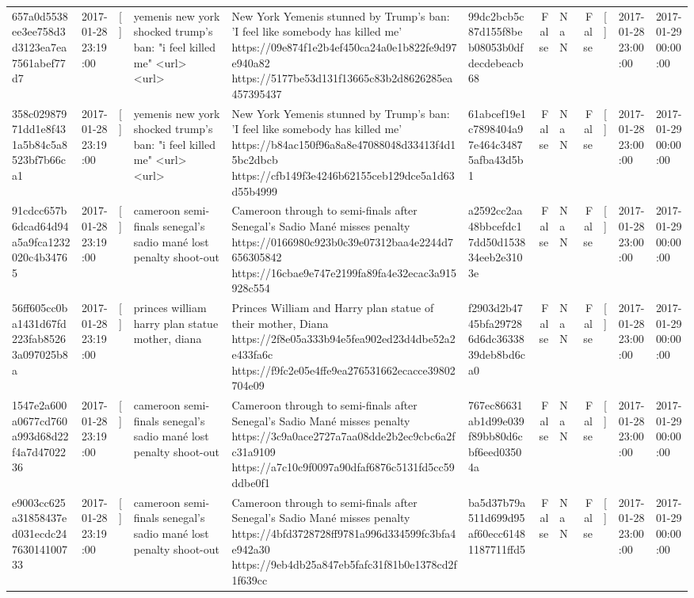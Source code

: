 \begin{tabular}{llllllrlrlll}
657a0d5538ee3ee758d3d3123ea7ea7561abef77d7 & 2017-01-28 23:19:00 & [] & yemenis new york shocked trump's ban: "i feel killed me" <url> <url> & New York Yemenis stunned by Trump's ban: 'I feel like somebody has killed me' https://09e874f1e2b4ef450ca24a0e1b822fe9d97e940a82 https://5177be53d131f13665c83b2d8626285ea457395437 & 99dc2bcb5c87d155f8beb08053b0dfdecdebeacb68 & False & NaN & False & [] & 2017-01-28 23:00:00 & 2017-01-29 00:00:00 \\
358c02987971dd1e8f431a5b84c5a8523bf7b66ca1 & 2017-01-28 23:19:00 & [] & yemenis new york shocked trump's ban: "i feel killed me" <url> <url> & New York Yemenis stunned by Trump's ban: 'I feel like somebody has killed me' https://b84ac150f96a8a8e47088048d33413f4d15bc2dbcb https://cfb149f3e4246b62155ceb129dce5a1d63d55b4999 & 61abcef19e1c7898404a97e464c34875afba43d5b1 & False & NaN & False & [] & 2017-01-28 23:00:00 & 2017-01-29 00:00:00 \\
91cdcc657b6dcad64d94a5a9fca1232020c4b34765 & 2017-01-28 23:19:00 & [] & cameroon semi-finals senegal's sadio mané lost penalty shoot-out & Cameroon through to semi-finals after Senegal’s Sadio Mané misses penalty https://0166980c923b0c39e07312baa4e2244d7656305842 https://16cbae9e747e2199fa89fa4e32ecac3a915928c554 & a2592cc2aa48bbcefdc17dd50d153834eeb2e3103e & False & NaN & False & [] & 2017-01-28 23:00:00 & 2017-01-29 00:00:00 \\
56ff605cc0ba1431d67fd223fab85263a097025b8a & 2017-01-28 23:19:00 & [] & princes william harry plan statue mother, diana & Princes William and Harry plan statue of their mother, Diana https://2f8e05a333b94e5fea902ed23d4dbe52a2e433fa6c https://f9fc2e05e4ffe9ea276531662ecacce39802704e09 & f2903d2b4745bfa297286d6dc3633839deb8bd6ca0 & False & NaN & False & [] & 2017-01-28 23:00:00 & 2017-01-29 00:00:00 \\
1547e2a600a0677cd760a993d68d22f4a7d4702236 & 2017-01-28 23:19:00 & [] & cameroon semi-finals senegal's sadio mané lost penalty shoot-out & Cameroon through to semi-finals after Senegal’s Sadio Mané misses penalty https://3c9a0ace2727a7aa08dde2b2ec9cbc6a2fc31a9109 https://a7c10c9f0097a90dfaf6876c5131fd5cc59ddbe0f1 & 767ec86631ab1d99e039f89bb80d6cbf6eed03504a & False & NaN & False & [] & 2017-01-28 23:00:00 & 2017-01-29 00:00:00 \\
e9003cc625a31858437ed031ecdc24763014100733 & 2017-01-28 23:19:00 & [] & cameroon semi-finals senegal's sadio mané lost penalty shoot-out & Cameroon through to semi-finals after Senegal’s Sadio Mané misses penalty https://4bfd3728728ff9781a996d334599fc3bfa4e942a30 https://9eb4db25a847eb5fafc31f81b0e1378cd2f1f639cc & ba5d37b79a511d699d95af60ecc61481187711ffd5 & False & NaN & False & [] & 2017-01-28 23:00:00 & 2017-01-29 00:00:00 \\

\end{tabular}
